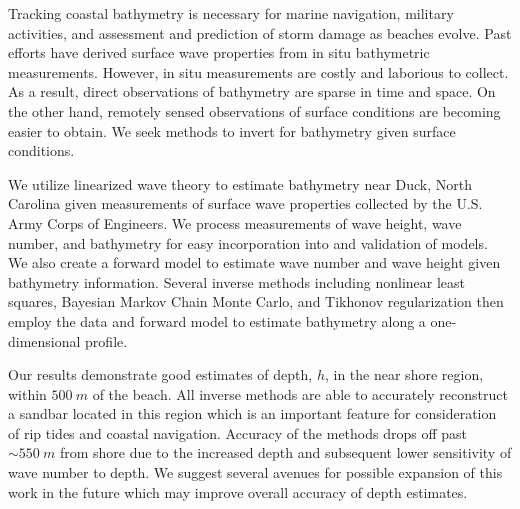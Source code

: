 Tracking coastal bathymetry is necessary for marine navigation, military activities, and assessment and prediction of storm damage as beaches evolve. Past efforts have derived surface wave properties from in situ bathymetric measurements. However, in situ measurements are costly and laborious to collect. As a result, direct observations of bathymetry are sparse in time and space. On the other hand, remotely sensed observations of surface conditions are becoming easier to obtain. We seek methods to invert for bathymetry given surface conditions. 

We utilize linearized wave theory to estimate bathymetry near Duck, North Carolina given measurements of surface wave properties collected by the U.S. Army Corps of Engineers. We process measurements of wave height, wave number, and bathymetry for easy incorporation into and validation of models. We also create a forward model to estimate wave number and wave height given bathymetry information. Several inverse methods including nonlinear least squares, Bayesian Markov Chain Monte Carlo, and Tikhonov regularization then employ the data and forward model to estimate bathymetry along a one-dimensional profile.

Our results demonstrate good estimates of depth, $h$, in the near shore region, within $500~m$ of the beach. All inverse methods are able to accurately reconstruct a sandbar located in this region which is an important feature for consideration of rip tides and coastal navigation. Accuracy of the methods drops off past $\sim550~m$ from shore due to the increased depth and subsequent lower sensitivity of wave number to depth. We suggest several avenues for possible expansion of this work in the future which may improve overall accuracy of depth estimates.